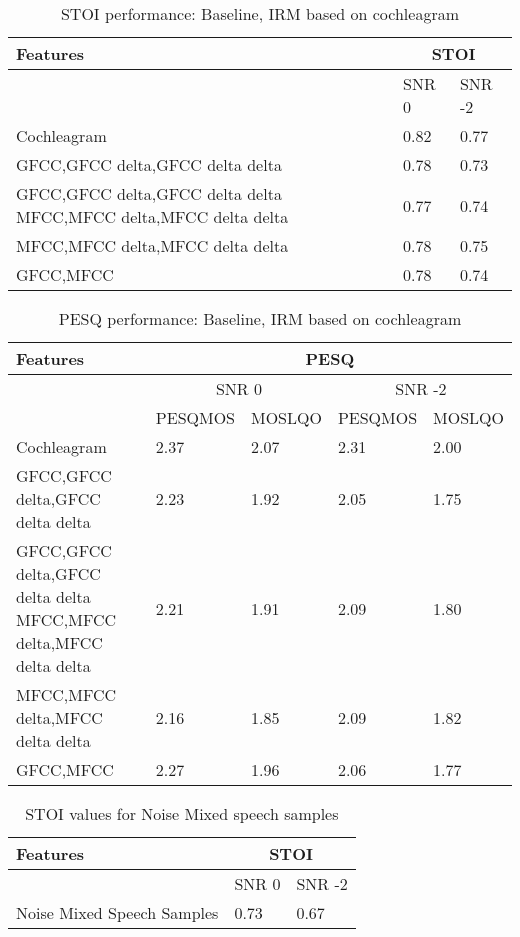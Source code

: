 \begin{table}[!htbp]
\centering
\begin{tabular}{ |p{12cm}|p{1.7cm}|p{1.7cm}|  }
\hline
\textbf{Features} & \multicolumn{2}{|c|}{\textbf{STOI}} \\
\hline
\cellcolor{black} & SNR 0 & SNR -2 \\
\hline
\rowcolor[HTML]{ADD8E6}Cochleagram	& 0.82	& 0.77\\
\hline
GFCC,GFCC delta,GFCC delta delta	& 0.78	& 0.73\\
\hline
GFCC,GFCC delta,GFCC delta delta MFCC,MFCC delta,MFCC delta delta	& 0.77	& 0.74\\
\hline
MFCC,MFCC delta,MFCC delta delta	& 0.78	& 0.75\\
\hline
GFCC,MFCC	& 0.78	& 0.74\\
\hline
\end{tabular}
\caption{STOI performance: Baseline, IRM based on cochleagram}
\label{tab:dnn_0_stoi_1}
\end{table}

\begin{table}[!htbp]
\centering
\begin{tabular}{ |p{8cm}|p{1.7cm}|p{1.7cm}|p{1.7cm}|p{1.7cm}|  }
\hline
\textbf{Features} & \multicolumn{4}{|c|}{\textbf{PESQ}}\\
\hline
\cellcolor{black} & \multicolumn{2}{|c|}{SNR 0} & \multicolumn{2}{|c|}{SNR -2}\\
\hline
\cellcolor{black} & PESQMOS & MOSLQO & PESQMOS & MOSLQO\\
\hline
\cellcolor[HTML]{ADD8E6}Cochleagram	& \cellcolor[HTML]{ADD8E6}2.37	& \cellcolor[HTML]{ADD8E6}2.07	& \cellcolor{yellow}2.31	& \cellcolor{yellow}2.00\\
\hline
GFCC,GFCC delta,GFCC delta delta	& 2.23	& 1.92	& 2.05	& 1.75\\
\hline
GFCC,GFCC delta,GFCC delta delta MFCC,MFCC delta,MFCC delta delta	& 2.21	& 1.91	& 2.09	& 1.80\\
\hline
MFCC,MFCC delta,MFCC delta delta	& 2.16	& 1.85	& 2.09	& 1.82\\
\hline
GFCC,MFCC	& 2.27	& 1.96	& 2.06	& 1.77\\
\hline
\end{tabular}
\caption{PESQ performance: Baseline, IRM based on cochleagram}
\label{tab:dnn_0_pesq_2}
\end{table}


\begin{table}[!htbp]
\centering
\begin{tabular}{ |p{12cm}|p{1.7cm}|p{1.7cm}|  }
\hline
\textbf{Features} & \multicolumn{2}{|c|}{\textbf{STOI}} \\
\hline
\cellcolor{black} & SNR 0 & SNR -2 \\
\hline
Noise Mixed Speech Samples	& 0.73	& 0.67\\
\hline
\end{tabular}
\caption{STOI values for Noise Mixed speech samples}
\label{tab:stoi_mix}
\end{table}
